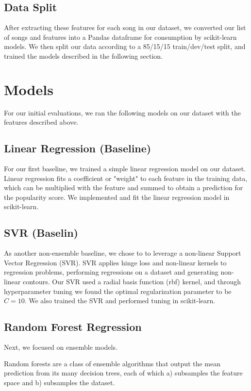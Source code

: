 \documentclass[journal]{IEEEtran}
\begin{document}
\subsection{Data Split}
After extracting these features for each song in our dataset, we converted our list of songs and features into a Pandas dataframe for consumption by scikit-learn models. We then split our data according to a 85/15/15 train/dev/test split, and trained the models described in the following section. \\


\section{Models}

For our initial evaluations, we ran the following models on our dataset with the features described above.

\subsection{Linear Regression (Baseline)}
For our first baseline, we trained a simple linear regression model on our dataset. Linear regression fits a coefficient or "weight" to each feature in the training data, which can be multiplied with the feature and summed to obtain a prediction for the popularity score. We implemented and fit the linear regression model in scikit-learn.

\subsection{SVR (Baselin)}
As another non-ensemble baseline, we chose to to leverage a non-linear Support Vector Regression (SVR). SVR applies hinge loss and non-linear kernels to regression problems, performing regressions on a dataset and generating non-linear contours. Our SVR used a radial basis function (rbf) kernel, and through hyperparameter tuning we found the optimal regularization parameter to be $C = 10$. We also trained the SVR and performed tuning in scikit-learn.

\subsection{Random Forest Regression}
Next, we focused on ensemble models.

Random forests are a class of ensemble algorithms that output the mean prediction from its many decision trees, each of which a) subsamples the feature space and b) subsamples the dataset. 
\end{document}
